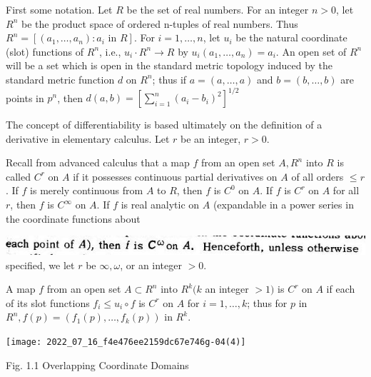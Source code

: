 \documentclass[10pt]{article}
\begin{document}
First some notation. Let $R$ be the set of real numbers. For an integer $n>0$, let $R^{n}$ be the product space of ordered n-tuples of real numbers. Thus $R^{n}=\left[\left(a_{1}, \ldots, a_{n}\right): a_{i}\right.$ in $\left.R\right]$. For $i=1, \ldots, n$, let $u_{i}$ be the natural coordinate (slot) functions of $R^{n}$, i.e., $u_{i} \cdot R^{n} \rightarrow R$ by $u_{i}\left(a_{1}, \ldots, a_{n}\right)=a_{i}$. An open set of $R^{n}$ will be a set which is open in the standard metric topology induced by the standard metric function $d$ on $R^{n}$; thus if $a=(a, \ldots, a)$ and $b=(b, \ldots, b)$ are points in $p^{n}$, then $d(a, b)=\left[\sum_{i=1}^{n}\left(a_{i}-b_{i}\right)^{2}\right]^{1 / 2}$

The concept of differentiability is based ultimately on the definition of a derivative in elementary calculus. Let $r$ be an integer, $r>0$.

Recall from advanced calculus that a map $f$ from an open set $A, R^{n}$ into $R$ is called $C^{r}$ on $A$ if it possesses continuous partial derivatives on $A$ of all orders $\leq r$. If $f$ is merely continuous from $A$ to $R$, then $f$ is $C^{0}$ on $A$. If $f$ is $C^{r}$ on $A$ for all $r$, then $f$ is $C^{\infty}$ on $A$. If $f$ is real analytic on $A$ (expandable in a power series in the coordinate functions about

\includegraphics[max width=\textwidth]{image1.jpg}
specified, we let $r$ be $\infty, \omega$, or an integer $>0$.

A map $f$ from an open set $A \subset R^{n}$ into $R^{k}(k$ an integer $>1)$ is $C^{r}$ on $A$ if each of its slot functions $f_{i} \leq u_{i} \circ f$ is $C^{r}$ on $A$ for $i=1, \ldots, k$; thus for $p$ in $R^{n}, f(p)=\left(f_{1}(p), \ldots, f_{k}(p)\right)$ in $R^{k}$.

\texttt{[image: 2022\_07\_16\_f4e476ee2159dc67e746g-04(4)]}

Fig. 1.1 Overlapping Coordinate Domains
\end{document}
